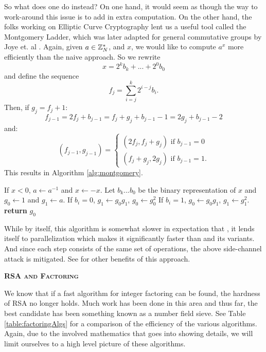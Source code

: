 So what does one do instead? On one hand, it would seem as though the way to work-around this issue is to add in extra computation. On the other hand, the folks working on Elliptic Curve Cryptography lent us a useful tool called the Montgomery Ladder, which was later adapted for general commutative groups by Joye et. al \cite{joye2002montgomery}. Again, given $a\in {{\mathbb Z}}_N^*$, and $x$, we would like to compute $a^x$ more efficiently than the naive approach. So we rewrite 
\[
x = 2^{k}b_k + ...  + 2^0 b_0
\] 
and define the sequence 
\[
f_j = \sum_{i = j}^{k} 2^{i - j} b_i.
\]
Then, if $g_j = f_j + 1$:
\[
f_{j-1} = 2 f_j + b_{j-1} = f_j + g_j + b_{j - 1} - 1 = 2 g_j + b_{j - 1} - 2
\]
and:
\[
(f_{j-1}, g_{j-1}) = 
\begin{cases}
(2f_j,  f_j + g_j) \text{ if } b_{j - 1} = 0\\
(f_j + g_j, 2g_j) \text{ if } b_{j - 1} = 1.
\end{cases}
\]
This results in Algorithm \ref{alg:montgomery}.
\begin{algorithm}[H]
\begin{algorithmic}[1]
  \scriptsize
  \State If $x < 0$, $a\longleftarrow a^{-1}$ and $x \longleftarrow -x$.
  \State Let $b_{k}...b_0$ be the binary representation of $x$ and $g_0 \longleftarrow 1$ and $g_1 \longleftarrow a$.
  	\State If $b_i = 0$, $g_1 \longleftarrow g_0g_1$, $g_0 \longleftarrow g_0^2$
	\State If $b_i = 1$, $g_0 \longleftarrow g_0 g_1$, $g_1 \longleftarrow g_1^2$.
  \EndFor
  \State \textbf{return} {$g_0$}
\end{algorithmic}
\caption{\mont$(a, x)$}
\label{alg:montgomery}
\end{algorithm}

While by itself, this algorithm is somewhat slower in expectation that \fpow, it lends itself to parallelization which makes it significantly faster than \fpow and its variants. And since each step consists of the same set of operations, the above side-channel attack is mitigated. See \cite{joye2002montgomery} for other benefits of this approach.


\vspace{0.25cm}
\noindent\textsc{\textbf{RSA and Factoring}}

We know that if a fast algorithm for integer factoring can be found, the hardness of RSA no longer holds. Much work has been done in this area and thus far, the best candidate has been something known as a number field sieve.  See Table \ref{table:factoringAlgs} for a comparison of the efficiency of the various algorithms.  Again, due to the involved mathematics that goes into showing details, we will limit ourselves to a high level picture of these algorithms. 

